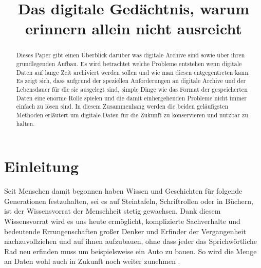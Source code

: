 \documentclass[conference,compsoc,final,a4paper]{IEEEtran}
\newcommand{\autoren}[0]{Nockel, Sascha}
\newcommand{\dokumententitel}[0]{Das digitale Gedächtnis, warum erinnern allein nicht ausreicht}
\begin{document}
\title{\dokumententitel}

\author{
  \IEEEauthorblockN{\autoren}
}

\maketitle
\thispagestyle{plain}
\pagestyle{plain}


\begin{abstract}
Dieses Paper gibt einen Überblick darüber was digitale Archive sind sowie über ihren grundlegenden Aufbau. Es wird betrachtet welche Probleme entstehen wenn digitale Daten auf lange Zeit archiviert werden sollen und wie man diesen entgegentreten kann. Es zeigt sich, dass aufgrund der speziellen Anforderungen an digitale Archive und der Lebensdauer für die sie ausgelegt sind, simple Dinge wie das Format der gespeicherten Daten eine enorme Rolle spielen und die damit einhergehenden Probleme nicht immer einfach zu lösen sind. In diesem Zusammenhang werden die beiden geläufigsten Methoden erläutert um digitale Daten für die Zukunft zu konservieren und nutzbar zu halten.

\end{abstract}

{\small\tableofcontents}

\section{Einleitung}
Seit Menschen damit begonnen haben Wissen und Geschichten für folgende Generationen festzuhalten, sei es auf Steintafeln, Schriftrollen oder in Büchern, ist der Wissensvorrat der Menschheit stetig gewachsen. Dank diesem Wissensvorrat wird es uns heute ermöglicht, komplizierte Sachverhalte und bedeutende Errungenschaften großer Denker und Erfinder der Vergangenheit nachzuvollziehen und auf ihnen aufzubauen, ohne dass jeder das Sprichwörtliche Rad neu erfinden muss um beispielsweise ein Auto zu bauen. So wird die Menge an Daten wohl auch in Zukunft noch weiter zunehmen \autocite{Reinsel2018}.
\end{document}
